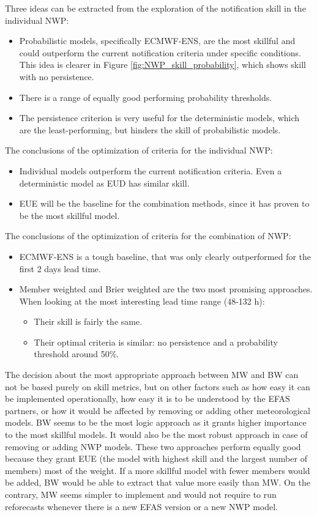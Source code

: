 \documentclass[preprint,12pt]{elsarticle}
\begin{document}
Three ideas can be extracted from the exploration of the notification skill in the individual NWP:
\begin{itemize}
    \item Probabilistic models, specifically ECMWF-ENS, are the most skillful and could outperform the current notification criteria under specific conditions. This idea is clearer in Figure \ref{fig:NWP_skill_probability}, which shows skill with no persistence.
    \item There is a range of equally good performing probability thresholds.
    \item The persistence criterion is very useful for the deterministic models, which are the least-performing, but hinders the skill of probabilistic models.
\end{itemize}

The conclusions of the optimization of criteria for the individual NWP:
\begin{itemize}
    \item Individual models outperform the current notification criteria. Even a deterministic model as EUD has similar skill.
    \item EUE will be the baseline for the combination methods, since it has proven to be the most skillful model.

\end{itemize}

The conclusions of the optimization of criteria for the combination of NWP:

\begin{itemize}
    \item ECMWF-ENS is a tough baseline, that was only clearly outperformed for the first 2 days lead time.
    \item Member weighted  and Brier weighted  are the two most promising approaches. When looking at the most interesting lead time range (48-132 h):
    \begin{itemize}
        \item Their skill is fairly the same.
        \item Their optimal criteria is similar: no persistence and a probability threshold around 50\%.
    \end{itemize}
\end{itemize}  

The decision about the most appropriate approach between MW and BW can not be based purely on skill metrics, but on other factors such as how easy it can be implemented operationally, how easy it is to be understood by the EFAS partners, or how it would be affected by removing or adding other meteorological models. BW seems to be the most logic approach as it grants higher importance to the most skillful models. It would also be the most robust approach in case of removing or adding NWP models. These two approaches perform equally good because they grant EUE (the model with highest skill and the largest number of members) most of the weight. If a more skillful model with fewer members would be added, BW would be able to extract that value more easily than MW. On the contrary, MW seems simpler to implement and would not require to run reforecasts whenever there is a new EFAS version or a new NWP model.
\end{document}
